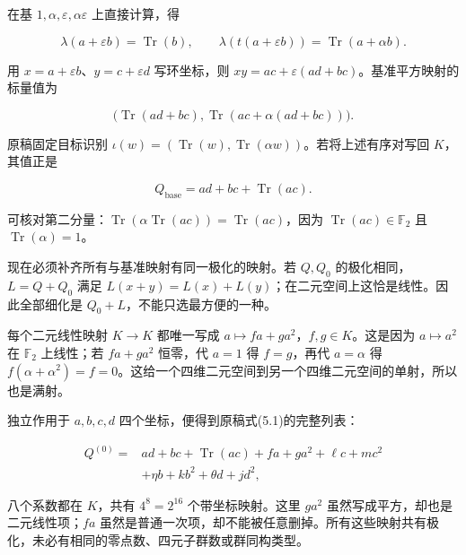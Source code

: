 \documentclass[UTF8,fontset=fandol,zihao=-4,openany,oneside]{ctexbook}
\begin{document}
在基 \(1,\alpha,\varepsilon,\alpha\varepsilon\) 上直接计算，得



\[
\lambda(a+\varepsilon b)=\operatorname{Tr}(b),\qquad
\lambda(t(a+\varepsilon b))=\operatorname{Tr}(a+\alpha b).
\]



用 \(x=a+\varepsilon b\)、\(y=c+\varepsilon d\) 写环坐标，则 \(xy=ac+\varepsilon(ad+bc)\)。基准平方映射的标量值为



\[
\bigl(\operatorname{Tr}(ad+bc),\operatorname{Tr}(ac+\alpha(ad+bc))\bigr).
\]



原稿固定目标识别 \(\iota(w)=(\operatorname{Tr}(w),\operatorname{Tr}(\alpha w))\)。若将上述有序对写回 \(K\)，其值正是



\[
Q_{\mathrm{base}}=ad+bc+\operatorname{Tr}(ac).
\]



可核对第二分量：\(\operatorname{Tr}(\alpha\operatorname{Tr}(ac))=\operatorname{Tr}(ac)\)，因为 \(\operatorname{Tr}(ac)\in\mathbb F_2\) 且 \(\operatorname{Tr}(\alpha)=1\)。



现在必须补齐所有与基准映射有同一极化的映射。若 \(Q,Q_0\) 的极化相同，\(L=Q+Q_0\) 满足 \(L(x+y)=L(x)+L(y)\)；在二元空间上这恰是线性。因此全部细化是 \(Q_0+L\)，不能只选最方便的一种。



每个二元线性映射 \(K\to K\) 都唯一写成 \(a\mapsto fa+ga^2\)，\(f,g\in K\)。这是因为 \(a\mapsto a^2\) 在 \(\mathbb F_2\) 上线性；若 \(fa+ga^2\) 恒零，代 \(a=1\) 得 \(f=g\)，再代 \(a=\alpha\) 得 \(f(\alpha+\alpha^2)=f=0\)。这给一个四维二元空间到另一个四维二元空间的单射，所以也是满射。



独立作用于 \(a,b,c,d\) 四个坐标，便得到原稿式(5.1)的完整列表：



\[
\begin{aligned}
Q^{(0)}={}&ad+bc+\operatorname{Tr}(ac)
+fa+ga^2+\ell c+mc^2\\
&+\eta b+kb^2+\theta d+jd^2,
\end{aligned}
\]



八个系数都在 \(K\)，共有 \(4^8=2^{16}\) 个带坐标映射。这里 \(ga^2\) 虽然写成平方，却也是二元线性项；\(fa\) 虽然是普通一次项，却不能被任意删掉。所有这些映射共有极化，未必有相同的零点数、四元子群数或群同构类型。
\end{document}
